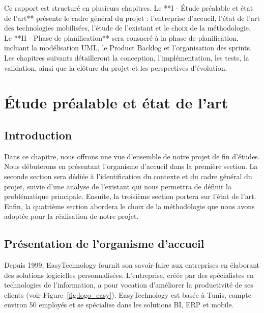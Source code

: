 \documentclass[12pt,a4paper]{report}
\begin{document}
Ce rapport est structuré en plusieurs chapitres. Le **I - Étude préalable et état de l’art** présente le cadre général du projet : l’entreprise d’accueil, l’état de l’art des technologies mobilisées, l’étude de l’existant et le choix de la méthodologie. Le **II - Phase de planification** sera consacré à la phase de planification, incluant la modélisation UML, le Product Backlog et l’organisation des sprints. Les chapitres suivants détailleront la conception, l’implémentation, les tests, la validation, ainsi que la clôture du projet et les perspectives d’évolution.


\chapter{Étude préalable et état de l’art}
\section{Introduction}

Dans ce chapitre, nous offrons une vue d’ensemble de notre projet de fin d’études. Nous débuterons en présentant l’organisme d’accueil dans la première section. La seconde section sera dédiée à l’identification du contexte et du cadre général du projet, suivie d’une analyse de l’existant qui nous permettra de définir la problématique principale. Ensuite, la troisième section portera sur l’état de l’art. Enfin, la quatrième section abordera le choix de la méthodologie que nous avons adoptée pour la réalisation de notre projet.

\section{Présentation de l’organisme d’accueil}
Depuis 1999, EasyTechnology fournit son savoir-faire aux entreprises en élaborant des solutions logicielles personnalisées. L’entreprise, créée par des spécialistes en technologies de l’information, a pour vocation d’améliorer la productivité de ses clients (voir Figure~\ref{fig:logo_easy}). EasyTechnology est basée à Tunis, compte environ 50 employés et se spécialise dans les solutions BI, ERP et mobile.
\end{document}
